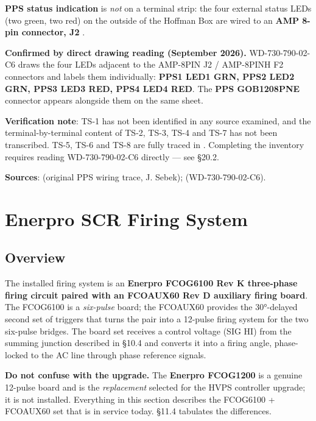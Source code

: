\textbf{PPS status indication} is \emph{not} on a terminal strip: the four external status LEDs (two green, two red) on the outside of the Hoffman Box are wired to an \textbf{AMP 8-pin connector, J2} .

\begin{keynote}
\textbf{Confirmed by direct drawing reading (September 2026).} WD-730-790-02-C6  draws the four LEDs adjacent to the AMP-8PIN J2 / AMP-8PINH F2 connectors and labels them individually: \textbf{PPS1 LED1 GRN, PPS2 LED2 GRN, PPS3 LED3 RED, PPS4 LED4 RED}. The \textbf{PPS GOB1208PNE} connector appears alongside them on the same sheet.
\end{keynote}

\begin{keynote}
\textbf{Verification note}: TS-1 has not been identified in any source examined, and the terminal-by-terminal content of TS-2, TS-3, TS-4 and TS-7 has not been transcribed. TS-5, TS-6 and TS-8 are fully traced in . Completing the inventory requires reading WD-730-790-02-C6 directly --- see §20.2.
\end{keynote}

\begin{keynote}
\textbf{Sources}:  (original PPS wiring trace, J. Sebek);  (WD-730-790-02-C6).
\end{keynote}



\section{Enerpro SCR Firing System}

\subsection{Overview}

The installed firing system is an \textbf{Enerpro FCOG6100 Rev K three-phase firing circuit paired with an FCOAUX60 Rev D auxiliary firing board}. The FCOG6100 is a \emph{six-pulse} board; the FCOAUX60 provides the 30°-delayed second set of triggers that turns the pair into a 12-pulse firing system for the two six-pulse bridges. The board set receives a control voltage (SIG HI) from the summing junction described in §10.4 and converts it into a firing angle, phase-locked to the AC line through phase reference signals.

\begin{keynote}
\textbf{Do not confuse with the upgrade.} The \textbf{Enerpro FCOG1200} is a genuine 12-pulse board and is the \emph{replacement} selected for the HVPS controller upgrade; it is not installed. Everything in this section describes the FCOG6100 + FCOAUX60 set that is in service today. §11.4 tabulates the differences.
\end{keynote}

